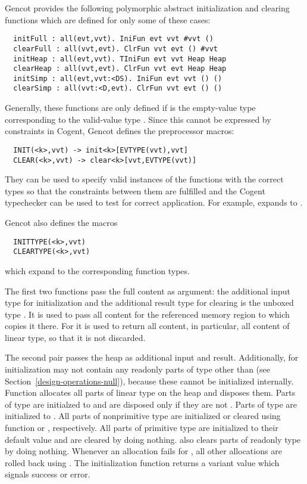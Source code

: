 Gencot provides the following polymorphic abstract initialization and clearing functions which are defined for only 
some of these cases:
\begin{verbatim}
  initFull : all(evt,vvt). IniFun evt vvt #vvt ()
  clearFull : all(vvt,evt). ClrFun vvt evt () #vvt
  initHeap : all(evt,vvt). TIniFun evt vvt Heap Heap
  clearHeap : all(vvt,evt). ClrFun vvt evt Heap Heap
  initSimp : all(evt,vvt:<DS). IniFun evt vvt () ()
  clearSimp : all(vvt:<D,evt). ClrFun vvt evt () ()
\end{verbatim}
Generally, these functions are only defined if  is the empty-value type corresponding to the valid-value
type . Since this cannot be expressed by constraints in Cogent, Gencot defines the preprocessor macros:
\begin{verbatim}
  INIT(<k>,vvt) -> init<k>[EVTYPE(vvt),vvt]
  CLEAR(<k>,vvt) -> clear<k>[vvt,EVTYPE(vvt)]
\end{verbatim}
They can be used to specify valid instances of the functions with the correct types so that the constraints
between them are fulfilled and the Cogent typechecker can be used to test for correct application.
For example,  expands to .

Gencot also defines the macros
\begin{verbatim}
  INITTYPE(<k>,vvt)
  CLEARTYPE(<k>,vvt)
\end{verbatim}
which expand to the corresponding function types.

The first two functions pass the full content as argument: the additional input type for initialization and the additional
result type for clearing is the
unboxed type . It is used to pass all content for the referenced memory region to  which
copies it there. For  it is used to return all content, in particular, all content of linear type, so that 
it is not discarded.

The second pair passes the heap as additional input and result. Additionally, for initialization 
may not contain any readonly parts of type other than  (see Section~\ref{design-operations-null}), 
because these cannot be initialized internally. Function  allocates all parts of linear type on the heap 
and  disposes them. Parts of type  are initialzed to  and are disposed only 
if they are not . Parts of type  are initialized to .
All parts of nonprimitive type are
initialized or cleared using function  or , respectively.
All parts of primitive type are initialized to their default value  and are cleared by
doing nothing.  also clears parts of readonly type by doing nothing. Whenever an allocation fails for 
, all other allocations are rolled back using . The initialization function returns a variant
value which signals success or error.

